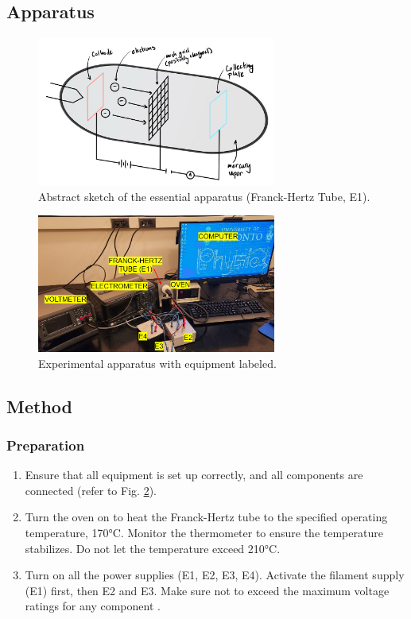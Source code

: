 \documentclass[12pt]{article}
\begin{document}
\subsection{Apparatus}
\begin{figure}[h!]
    \centering
    \includegraphics[width=0.7\textwidth]{figure/apparatus image.jpeg}
    \caption{Abstract sketch of the essential apparatus (Franck-Hertz Tube, E1).}
    \label{fig:1}
\end{figure}

\begin{figure}[h!]
    \centering
    \includegraphics[width=0.7\textwidth]{figure/image of lab.PNG}
    \caption{Experimental apparatus with equipment labeled.}
    \label{fig:2}
\end{figure}

\newpage

\subsection{Method} 

\subsubsection{Preparation}
\begin{enumerate}
    \item Ensure that all equipment is set up correctly, and all components are connected (refer to Fig. \ref{fig:2}).
    \item Turn the oven on to heat the Franck-Hertz tube to the specified operating temperature, 170°C. Monitor the thermometer to ensure the temperature stabilizes. Do not let the temperature exceed 210°C. 
    \item Turn on all the power supplies (E1, E2, E3, E4). Activate the filament supply (E1) first, then E2 and E3. Make sure not to exceed the maximum voltage ratings for any component \autocite{manuall}.
\end{enumerate}
\end{document}
